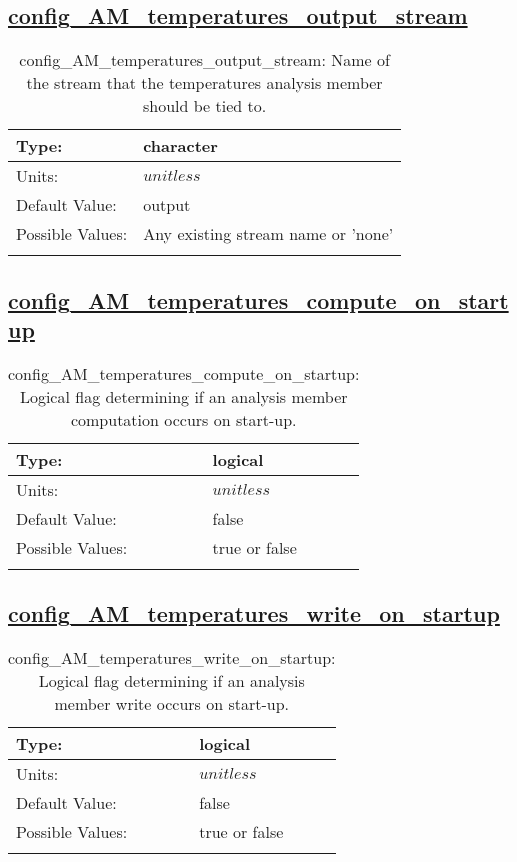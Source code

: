 \subsection[config\_AM\_temperatures\_output\_stream]{\hyperref[sec:nm_tab_AM_temperatures]{config\_AM\_temperatures\_output\_stream}}
\label{subsec:nm_sec_config_AM_temperatures_output_stream}
\begin{center}
\begin{longtable}{| p{2.0in} || p{4.0in} |}
    \hline
    Type: & character \\
    \hline
    Units: & $unitless$ \\
    \hline
    Default Value: & output \\
    \hline
    Possible Values: & Any existing stream name or 'none' \\
    \hline
    \caption{config\_AM\_temperatures\_output\_stream: Name of the stream that the temperatures analysis member should be tied to.}
\end{longtable}
\end{center}
\subsection[config\_AM\_temperatures\_compute\_on\_startup]{\hyperref[sec:nm_tab_AM_temperatures]{config\_AM\_temperatures\_compute\_on\_startup}}
\label{subsec:nm_sec_config_AM_temperatures_compute_on_startup}
\begin{center}
\begin{longtable}{| p{2.0in} || p{4.0in} |}
    \hline
    Type: & logical \\
    \hline
    Units: & $unitless$ \\
    \hline
    Default Value: & false \\
    \hline
    Possible Values: & true or false \\
    \hline
    \caption{config\_AM\_temperatures\_compute\_on\_startup: Logical flag determining if an analysis member computation occurs on start-up.}
\end{longtable}
\end{center}
\subsection[config\_AM\_temperatures\_write\_on\_startup]{\hyperref[sec:nm_tab_AM_temperatures]{config\_AM\_temperatures\_write\_on\_startup}}
\label{subsec:nm_sec_config_AM_temperatures_write_on_startup}
\begin{center}
\begin{longtable}{| p{2.0in} || p{4.0in} |}
    \hline
    Type: & logical \\
    \hline
    Units: & $unitless$ \\
    \hline
    Default Value: & false \\
    \hline
    Possible Values: & true or false \\
    \hline
    \caption{config\_AM\_temperatures\_write\_on\_startup: Logical flag determining if an analysis member write occurs on start-up.}
\end{longtable}
\end{center}
